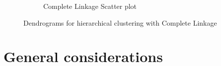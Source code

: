 \begin{figure}[H]
\begin{subfigure}[b]{0.49\textwidth}
        \caption{Complete Linkage Scatter plot}
        \label{fig:pairplot_ward_5}
    \end{subfigure}
    \caption{Dendrograms for hierarchical clustering with Complete Linkage}
    \label{fig:dendrograms_complete}
\end{figure}

\section{General considerations}\label{sec:considerations}